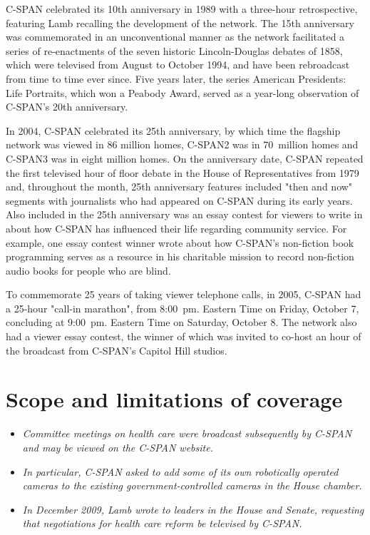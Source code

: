 C-SPAN celebrated its 10th anniversary in 1989 with a three-hour
retrospective, featuring Lamb recalling the development of the network.
The 15th anniversary was commemorated in an unconventional manner as the
network facilitated a series of re-enactments of the seven historic
Lincoln-Douglas debates of 1858, which were televised from August to
October 1994, and have been rebroadcast from time to time ever since.
Five years later, the series American Presidents: Life Portraits, which
won a Peabody Award, served as a year-long observation of C-SPAN's 20th
anniversary.

In 2004, C-SPAN celebrated its 25th anniversary, by which time the
flagship network was viewed in 86 million homes, C-SPAN2 was in
70~million homes and C-SPAN3 was in eight million homes. On the
anniversary date, C-SPAN repeated the first televised hour of floor
debate in the House of Representatives from 1979 and, throughout the
month, 25th anniversary features included "then and now" segments with
journalists who had appeared on C-SPAN during its early years. Also
included in the 25th anniversary was an essay contest for viewers to
write in about how C-SPAN has influenced their life regarding community
service. For example, one essay contest winner wrote about how C-SPAN's
non-fiction book programming serves as a resource in his charitable
mission to record non-fiction audio books for people who are blind.

To commemorate 25 years of taking viewer telephone calls, in 2005,
C-SPAN had a 25-hour "call-in marathon", from 8:00~pm. Eastern Time on
Friday, October 7, concluding at 9:00~pm. Eastern Time on Saturday,
October 8. The network also had a viewer essay contest, the winner of
which was invited to co-host an hour of the broadcast from C-SPAN's
Capitol Hill studios.

\section{Scope and limitations of
coverage}\label{scope-and-limitations-of-coverage}

\begin{itemize}
\item
  \emph{Committee meetings on health care were broadcast subsequently by
  C-SPAN and may be viewed on the C-SPAN website.}
\item
  \emph{In particular, C-SPAN asked to add some of its own robotically
  operated cameras to the existing government-controlled cameras in the
  House chamber.}
\item
  \emph{In December 2009, Lamb wrote to leaders in the House and Senate,
  requesting that negotiations for health care reform be televised by
  C-SPAN.}
\end{itemize}

